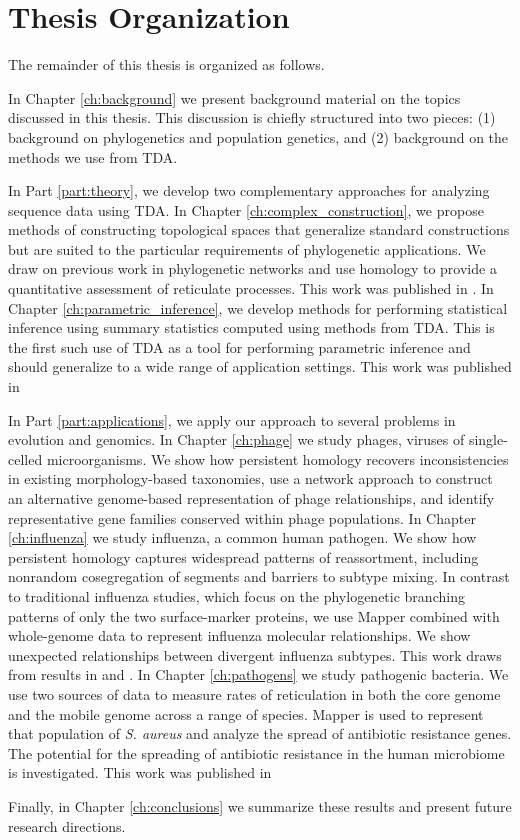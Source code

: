 \section{Thesis Organization}

The remainder of this thesis is organized as follows.

In Chapter \ref{ch:background} we present background material on the topics discussed in this thesis.
This discussion is chiefly structured into two pieces: (1) background on phylogenetics and population genetics, and (2) background on the methods we use from TDA.

In Part \ref{part:theory}, we develop two complementary approaches for analyzing sequence data using TDA.
In Chapter \ref{ch:complex_construction}, we propose methods of constructing topological spaces that generalize standard constructions but are suited to the particular requirements of phylogenetic applications.
We draw on previous work in phylogenetic networks and use homology to provide a quantitative assessment of reticulate processes.
This work was published in \cite{Emmett:2015a}.
In Chapter \ref{ch:parametric_inference}, we develop methods for performing statistical inference using summary statistics computed using methods from TDA.
This is the first such use of TDA as a tool for performing parametric inference and should generalize to a wide range of application settings.
This work was published in \cite{Emmett:2014b}

In Part \ref{part:applications}, we apply our approach to several problems in evolution and genomics.
In Chapter \ref{ch:phage} we study phages, viruses of single-celled microorganisms.
We show how persistent homology recovers inconsistencies in existing morphology-based taxonomies, use a network approach to construct an alternative genome-based representation of phage relationships, and identify representative gene families conserved within phage populations.
In Chapter \ref{ch:influenza} we study influenza, a common human pathogen.
We show how persistent homology captures widespread patterns of reassortment, including nonrandom cosegregation of segments and barriers to subtype mixing.
In contrast to traditional influenza studies, which focus on the phylogenetic branching patterns of only the two surface-marker proteins, we use Mapper combined with whole-genome data to represent influenza molecular relationships.
We show unexpected relationships between divergent influenza subtypes.
This work draws from results in \cite{Chan:2013} and \cite{Emmett:2014b}.
In Chapter \ref{ch:pathogens} we study pathogenic bacteria.
We use two sources of data to measure rates of reticulation in both the core genome and the mobile genome across a range of species.
Mapper is used to represent that population of \emph{S. aureus} and analyze the spread of antibiotic resistance genes.
The potential for the spreading of antibiotic resistance in the human microbiome is investigated.
This work was published in \cite{Emmett:2014a}

Finally, in Chapter \ref{ch:conclusions} we summarize these results and present future research directions.